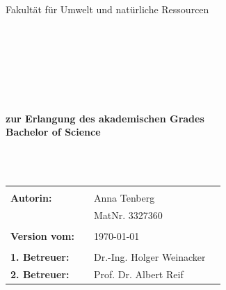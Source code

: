 \begin{center}
\Large{Fakultät für Umwelt und natürliche Ressourcen}
\end{center}
\begin{verbatim}

\end{verbatim}
\begin{center}
\doublespacing
\textbf{\LARGE{\titleDocument}}\\
\singlespacing
\begin{verbatim}

\end{verbatim}
\textbf{{~\subjectDocument~}}
\end{center}
\begin{verbatim}

\end{verbatim}
\begin{center}

\end{center}
\begin{verbatim}

\end{verbatim}
\begin{center}
\textbf{zur Erlangung des akademischen Grades \\ Bachelor of Science}
\end{center}
\begin{verbatim}



\end{verbatim}
\begin{flushleft}
\begin{tabular}{llll}
& & \\
\textbf{Autorin:} & & Anna Tenberg & \\
& & MatNr. 3327360 & \\
& & \\
\textbf{Version vom:} & & \today &\\
& & \\
\textbf{1. Betreuer:} & & Dr.-Ing. Holger Weinacker &\\
\textbf{2. Betreuer:} & & Prof. Dr. Albert Reif &\\
\end{tabular}
\end{flushleft}
